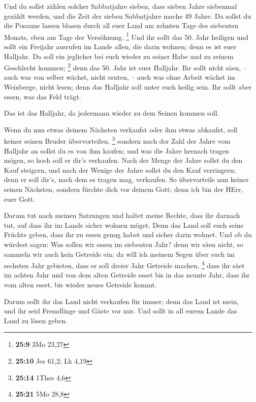  Und du sollst zählen solcher Sabbatjahre sieben, dass
sieben Jahre siebenmal gezählt werden, und die Zeit der sieben
Sabbatjahre mache 49 Jahre.  Da sollst du die Posaune
lassen blasen durch all euer Land am zehnten Tage des siebenten Monats,
eben am Tage der Versöhnung. \footnote{\textbf{25:9} 3Mo 23,27}
 Und ihr sollt das 50. Jahr heiligen und sollt ein
Freijahr ausrufen im Lande allen, die darin wohnen; denn es ist euer
Halljahr. Da soll ein jeglicher bei euch wieder zu seiner Habe und zu
seinem Geschlecht kommen; \footnote{\textbf{25:10} Jes 61,2; Lk 4,19}
 denn das 50. Jahr ist euer Halljahr. Ihr sollt nicht
säen, -- auch was von selber wächst, nicht ernten, -- auch was ohne
Arbeit wächst im Weinberge, nicht lesen;  denn das
Halljahr soll unter euch heilig sein. Ihr sollt aber essen, was das Feld
trägt.

 Das ist das Halljahr, da jedermann wieder zu dem Seinen
kommen soll.

 Wenn du nun etwas deinem Nächsten verkaufst oder ihm
etwas abkaufst, soll keiner seinen Bruder übervorteilen, \footnote{\textbf{25:14}
  1Thes 4,6}  sondern nach der Zahl der Jahre vom
Halljahr an sollst du es von ihm kaufen; und was die Jahre hernach
tragen mögen, so hoch soll er dir's verkaufen.  Nach der
Menge der Jahre sollst du den Kauf steigern, und nach der Wenige der
Jahre sollst du den Kauf verringern; denn er soll dir's, nach dem es
tragen mag, verkaufen.  So übervorteile nun keiner seinen
Nächsten, sondern fürchte dich vor deinem Gott; denn ich bin der HErr,
euer Gott.

 Darum tut nach meinen Satzungen und haltet meine Rechte,
dass ihr darnach tut, auf dass ihr im Lande sicher wohnen möget.
 Denn das Land soll euch seine Früchte geben, dass ihr zu
essen genug habet und sicher darin wohnet.  Und ob du
würdest sagen: Was sollen wir essen im siebenten Jahr? denn wir säen
nicht, so sammeln wir auch kein Getreide ein:  da will
ich meinem Segen über euch im sechsten Jahr gebieten, dass er soll
dreier Jahr Getreide machen, \footnote{\textbf{25:21} 5Mo 28,8}
 dass ihr säet im achten Jahr und von dem alten Getreide
esset bis in das neunte Jahr, dass ihr vom alten esset, bis wieder neues
Getreide kommt.

 Darum sollt ihr das Land nicht verkaufen für immer; denn
das Land ist mein, und ihr seid Fremdlinge und Gäste vor mir.
 Und sollt in all eurem Lande das Land zu lösen geben.

